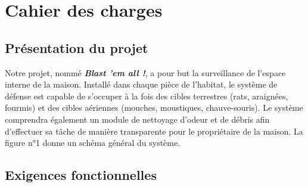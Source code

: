 
\section{Cahier des charges}

\subsection{Présentation du projet}

Notre projet, nommé \textit{\textbf{Blast 'em all !}}, a pour but la
surveillance de l'espace interne de la maison. Installé dans chaque pièce
de l'habitat, le système de défense est capable de s'occuper à la fois des
cibles terrestres (rats, araignées, fourmis) et des cibles aériennes
(mouches, moustiques, chauve-souris). Le système comprendra également un
module de nettoyage d'odeur et de débris afin d'effectuer sa tâche de
manière transparente pour le propriétaire de la maison. La figure n°1
donne un schéma général du système.


\subsection{Exigences fonctionnelles}

